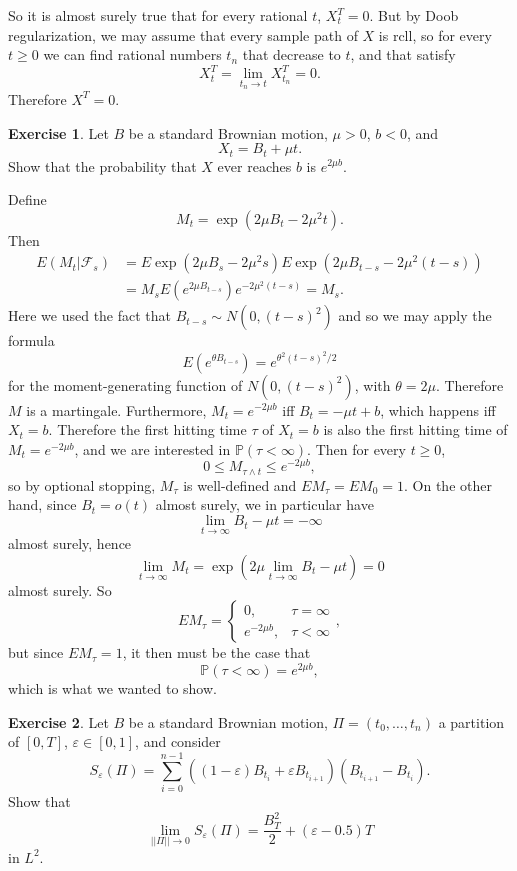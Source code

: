 \documentclass[10pt]{article}
\newcommand{\PP}{\mathbb P}
\renewcommand{\epsilon}{\varepsilon}
\theoremstyle{definition}
\newtheorem{exer}{Exercise}
\begin{document}
So it is almost surely true that for every rational $t$, $X_t^T = 0$.
But by Doob regularization, we may assume that every sample path of $X$ is rcll, so for every $t \geq 0$ we can find rational numbers $t_n$ that decrease to $t$, and that satisfy
$$X_t^T = \lim_{t_n \to t} X_{t_n}^T = 0.$$
Therefore $X^T = 0$.

\begin{exer}
Let $B$ be a standard Brownian motion, $\mu > 0$, $b < 0$, and
$$X_t = B_t + \mu t.$$
Show that the probability that $X$ ever reaches $b$ is $e^{2\mu b}$.
\end{exer}

Define
$$M_t = \exp(2\mu B_t - 2\mu^2 t).$$
Then
\begin{align*}
E(M_t|\mathcal F_s) &= E\exp(2\mu B_s - 2\mu^2 s) E\exp(2\mu B_{t - s} - 2\mu^2 (t - s))\\
&= M_s E(e^{2\mu B_{t-s}})  e^{-2\mu^2(t - s)} = M_s.
\end{align*}
Here we used the fact that $B_{t - s} \sim N(0, (t-s)^2)$ and so we may apply the formula
$$E(e^{\theta B_{t - s}}) = e^{\theta^2 (t - s)^2/2}$$
for the moment-generating function of $N(0, (t - s)^2)$, with $\theta = 2\mu$.
Therefore $M$ is a martingale.
Furthermore, $M_t = e^{-2\mu b}$ iff $B_t = -\mu t + b$, which happens iff $X_t = b$.
Therefore the first hitting time $\tau$ of $X_t = b$ is also the first hitting time of $M_t = e^{-2\mu b}$, and we are interested in $\PP(\tau < \infty)$.
Then for every $t \geq 0$,
$$0 \leq M_{\tau \wedge t} \leq e^{-2\mu b},$$
so by optional stopping, $M_\tau$ is well-defined and $EM_\tau = EM_0 = 1$.
On the other hand, since $B_t = o(t)$ almost surely, we in particular have
$$\lim_{t \to \infty} B_t - \mu t = -\infty$$
almost surely, hence
$$\lim_{t \to \infty} M_t = \exp\left(2\mu \lim_{t \to \infty} B_t - \mu t\right) = 0$$
almost surely. So
$$EM_\tau = \begin{cases}
0, &\tau = \infty\\
e^{-2\mu b}, &\tau < \infty
\end{cases},$$
but since $EM_\tau = 1$, it then must be the case that
$$\PP(\tau < \infty) = e^{2\mu b},$$
which is what we wanted to show.



\begin{exer}
Let $B$ be a standard Brownian motion, $\Pi = (t_0, \dots, t_n)$ a partition of $[0, T]$, $\epsilon \in [0, 1]$, and consider
$$S_\epsilon(\Pi) = \sum_{i=0}^{n-1} ((1 - \epsilon)B_{t_i} + \epsilon B_{t_{i+1}})(B_{t_{i+1}} - B_{t_i}).$$
Show that
$$\lim_{||\Pi|| \to 0} S_\epsilon(\Pi) = \frac{B_T^2}{2} + (\epsilon - 0.5)T$$
in $L^2$.
\end{exer}
\end{document}
